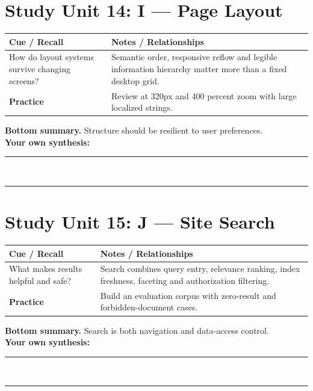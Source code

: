\documentclass[11pt]{article}
\begin{document}
\section{Study Unit 14: I — Page Layout}
\begin{longtable}{@{}p{.27\linewidth}p{.66\linewidth}@{}}\toprule
\textbf{Cue / Recall} & \textbf{Notes / Relationships}\\\midrule\endhead
How do layout systems survive changing screens? & Semantic order, responsive reflow and legible information hierarchy matter more than a fixed desktop grid.\\
\addlinespace[4mm]
\textbf{Practice} & Review at 320px and 400 percent zoom with large localized strings.\\\bottomrule\end{longtable}
\begin{dosnotebox}\textbf{Bottom summary.} Structure should be resilient to user preferences.\\[2mm]
\textbf{Your own synthesis:} \rule{.72\linewidth}{.4pt}\\[4mm]
\rule{.96\linewidth}{.4pt}\end{dosnotebox}

\section{Study Unit 15: J — Site Search}
\begin{longtable}{@{}p{.27\linewidth}p{.66\linewidth}@{}}\toprule
\textbf{Cue / Recall} & \textbf{Notes / Relationships}\\\midrule\endhead
What makes results helpful and safe? & Search combines query entry, relevance ranking, index freshness, faceting and authorization filtering.\\
\addlinespace[4mm]
\textbf{Practice} & Build an evaluation corpus with zero-result and forbidden-document cases.\\\bottomrule\end{longtable}
\begin{dosnotebox}\textbf{Bottom summary.} Search is both navigation and data-access control.\\[2mm]
\textbf{Your own synthesis:} \rule{.72\linewidth}{.4pt}\\[4mm]
\rule{.96\linewidth}{.4pt}\end{dosnotebox}
\end{document}
